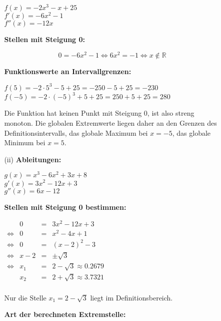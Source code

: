 \documentclass[a4paper,11pt]{scrartcl}
\newcommand{\step}[1]{\textbf{#1}}
\begin{document}
\begin{enumerate}
\begin{enumerate}
\begin{enumerate}
                \( f(x) = -2x^3-x+25 \)\\
                \( f'(x) = -6x^2-1 \)\\
                \( f''(x) = -12x \)

                \step{Stellen mit Steigung 0:}

                \[ 0 = -6x^2 - 1
                \Leftrightarrow 6x^2 = -1
                \Leftrightarrow x \not\in \mathbb{R} \]

                \step{Funktionswerte an Intervallgrenzen:}

                \( f(5) = - 2 \cdot 5^3 - 5 + 25 = -250-5+25 = -230  \)\\
                \( f(-5) = - 2 \cdot (-5)^3 + 5 + 25 = 250+5+25 = 280  \)

                Die Funktion hat keinen Punkt mit Steigung 0, ist also streng monoton.
                Die globalen Extremwerte liegen daher an den Grenzen des Definitionsintervalls,
                das globale Maximum bei $x = -5$, das globale Minimum bei $x = 5$.

            \newpage
            \item[(ii)]
                \step{Ableitungen:}

                \( g(x) = x^3-6x^2+3x+8 \)\\
                \( g'(x) = 3x^2-12x+3 \)\\
                \( g''(x) = 6x-12 \)

                \step{Stellen mit Steigung 0 bestimmen:}

                \(\begin{array}{rrcl}& 0 &=& 3x^2 - 12x + 3 \\
                \Leftrightarrow& 0 &=& x^2 - 4x + 1 \\
                \Leftrightarrow& 0 &=& (x - 2)^2 - 3 \\
                \Leftrightarrow& x - 2 &=& \pm \sqrt{3} \\
                \Leftrightarrow& x_1 &=& 2 - \sqrt{3} \approx 0.2679 \\
                               & x_2 &=& 2 + \sqrt{3} \approx 3.7321 \\
                \end{array}\)

                Nur die Stelle $x_1 = 2 - \sqrt{3}$ liegt im Definitionsbereich.

                \step{Art der berechneten Extremstelle:}


\end{enumerate}
\end{enumerate}
\end{enumerate}
\end{document}
